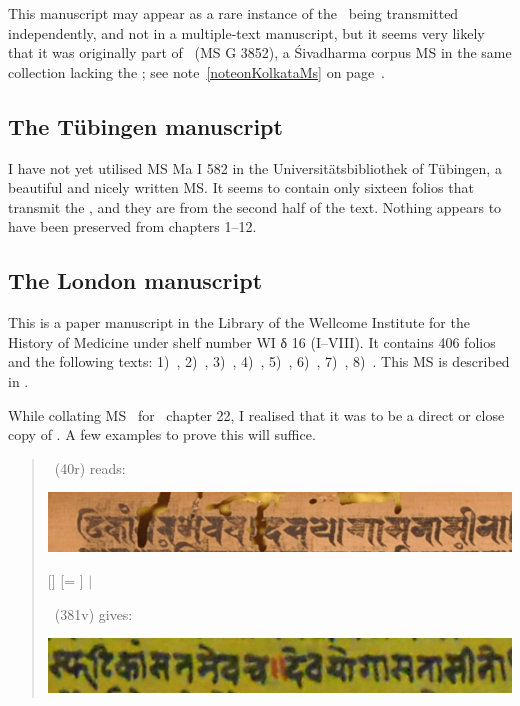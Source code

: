 This manuscript may appear as a rare instance of the \VSS\
being transmitted independently, and not in a multiple-text
manuscript, but it seems very likely that it was originally part of
\msKob\ (MS G 3852), a Śivadharma corpus MS  in the same collection 
lacking the \VSS; see note~\ref{noteonKolkataMs}
on page~\pageref{noteonKolkataMs}.


\medskip
\subsection{The Tübingen manuscript}

I have not yet utilised MS Ma I 582 in the Universitätsbibliothek of
Tübingen, a beautiful and nicely written MS. 
It seems to contain only sixteen folios that transmit the \VSS, 
and they are from the second half of the text. 
Nothing appears to have been preserved from chapters 1--12.

\medskip
\subsection{The London manuscript}

This is a paper manuscript in the
Library of the Wellcome Institute for the History of Medicine
under shelf number WI δ 16 (I--VIII). 
It contains 406 folios and the following texts: 
1)~\SDhS, 
2)~\SDhU,
3)~\SDhSangr, 
4)~\Ums,
5)~\SivaUp,
6)~\Uums,
7)~\Vss,
8)~\DharmP.
This MS is described in .

While collating MS \msL\ for \VSS\ chapter 22, 
I realised that it was to be a direct or close copy of \msNa. 
A few examples to prove this will suffice.

\begin{quote}
\msNa\ (\fol40r) reads: 

\includegraphics[scale=.3]{images/dasayoga_msNa.png}

[]\lk {} [= ] 
 $|$ 

\msL\ (\fol381v) gives:

\includegraphics[scale=.3]{images/dasayoga_msL.png}

\end{quote}

